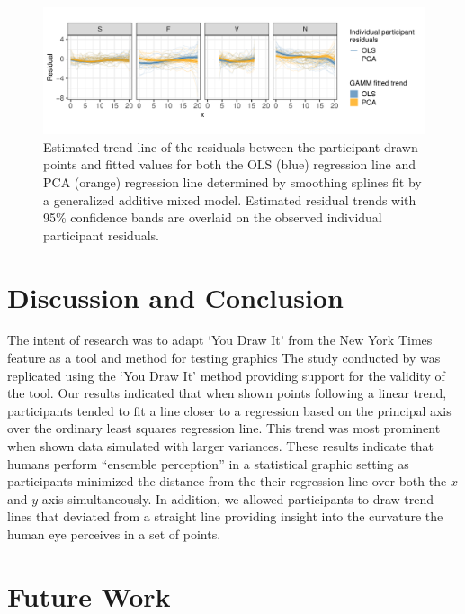 \documentclass[12pt]{article}
\begin{document}
\begin{figure}[tbp]

{\centering \includegraphics[width=1\linewidth,]{Eye-Fitting-Straight-Lines-in-the-Modern-Era_files/figure-latex/eyefitting-gamm-residualplots-1} 

}

\caption{Estimated trend line of the residuals between the participant drawn points and fitted values for both the OLS (blue) regression line and PCA (orange) regression line determined by smoothing splines fit by a generalized additive mixed model. Estimated residual trends with 95\% confidence bands are overlaid on the observed individual participant residuals.}\label{fig:eyefitting-gamm-residualplots}
\end{figure}

\hypertarget{discussion-and-conclusion}{%
\section{Discussion and Conclusion}\label{discussion-and-conclusion}}

The intent of research was to adapt `You Draw It' from the New York
Times feature as a tool and method for testing graphics The study
conducted by \citet{mosteller1981eye} was replicated using the `You Draw
It' method providing support for the validity of the tool. Our results
indicated that when shown points following a linear trend, participants
tended to fit a line closer to a regression based on the principal axis
over the ordinary least squares regression line. This trend was most
prominent when shown data simulated with larger variances. These results
indicate that humans perform ``ensemble perception'' in a statistical
graphic setting as participants minimized the distance from the their
regression line over both the \(x\) and \(y\) axis simultaneously. In
addition, we allowed participants to draw trend lines that deviated from
a straight line providing insight into the curvature the human eye
perceives in a set of points.

\hypertarget{future-work}{%
\section{Future Work}\label{future-work}}
\end{document}
